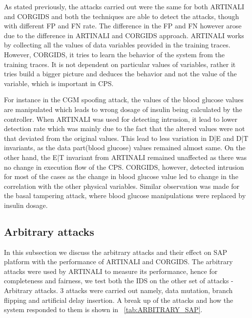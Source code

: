 As stated previously, the attacks carried out were the same for both ARTINALI and CORGIDS and both the techniques are able to detect the attacks, though with different FP and FN rate. The difference in the FP and FN however arose due to the difference in ARTINALI and CORGIDS approach. ARTINALI works by collecting all the values of data variables provided in the training traces. However, CORGIDS, it tries to learn the behavior of the system from the training traces. It is not dependent on particular values of variables, rather it tries build a bigger picture and deduces the behavior and not the value of the variable, which is important in CPS. 

For instance in the CGM spoofing attack, the values of the blood glucose values are manipulated which leads to wrong dosage of insulin being calculated by the controller. When ARTINALI was used for detecting intrusion, it lead to lower detection rate which was mainly due to the fact that the altered values were not that deviated from the original values. This lead to less variation in D|E and D|T invariants, as the data part(blood glucose) values remained almost same. On the other hand, the E|T invariant from ARTINALI remained unaffected as there was no change in execution flow of the CPS. CORGIDS, however, detected intrusion for most of the cases as the change in blood glucose value led to change in the correlation with the other physical variables. Similar observation was made for the basal tampering attack, where blood glucose manipulations were replaced by insulin dosage.


\subsection{Arbitrary attacks}
In this subsection we discuss the arbitrary attacks and their effect on SAP platform with the performance of ARTINALI and CORGIDS. The arbitrary attacks were used by ARTINALI to measure its performance, hence for completeness and fairness, we test both the IDS on the other set of attacks - Arbitrary attacks. 3 attacks were carried out namely, data mutation, branch flipping and artificial delay insertion. A break up of the attacks and how the system responded to them is shown in ~\autoref{tab:ARBITRARY_SAP}.

\begin{table}
\centering
  \caption{Arbitrary attacks on SAP platform and its response}
  \label{tab:ARBITRARY_SAP}
\end{table}

